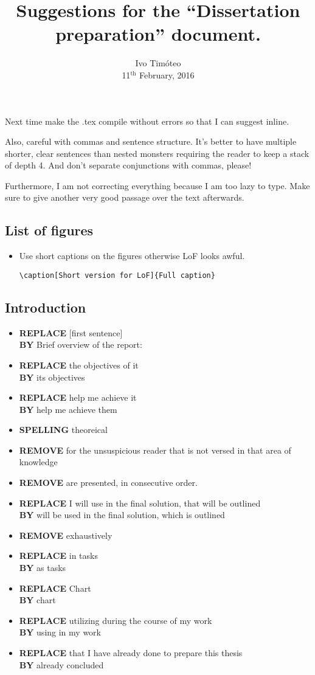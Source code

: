\documentclass[11pt]{scrartcl} %
\title{Suggestions for the ``Dissertation preparation'' document.}
\author{Ivo Timóteo \\11$^{\text{th}}$ February, 2016}
\date{}
\begin{document}
\maketitle

Next time make the .tex compile without errors so that I can suggest inline. 

Also, careful with commas and sentence structure. It's better to have multiple shorter, clear sentences than nested monsters requiring the reader to keep a stack of depth 4. And don't separate conjunctions with commas, please!

Furthermore, I am not correcting everything because I am too lazy to type. Make sure to give another very good passage over the text afterwards.

\subsection*{List of figures}
\begin{itemize}
	\item Use short captions on the figures otherwise LoF looks awful.
	\begin{verbatim}\caption[Short version for LoF]{Full caption}\end{verbatim}
\end{itemize}

\subsection*{Introduction}
\begin{itemize}
	\item {\bf REPLACE} [first sentence]\\{\bf BY} Brief overview of the report:
	\item {\bf REPLACE} the objectives of it\\{\bf BY} its objectives
	\item {\bf REPLACE} help me achieve it \\{\bf BY} help me achieve them
	\item {\bf SPELLING} theoreical
	\item {\bf REMOVE} for the unsuspicious reader that is not versed in that area of knowledge
	\item {\bf REMOVE} are presented, in consecutive order.
	\item {\bf REPLACE} I will use in the final solution, that will be outlined \\{\bf BY} will be used in the final solution, which is outlined
	\item {\bf REMOVE} exhaustively
	\item {\bf REPLACE} in tasks \\{\bf BY} as tasks
	\item {\bf REPLACE} Chart \\{\bf BY} chart
	\item {\bf REPLACE} utilizing during the course of my work \\{\bf BY} using in my work
	\item {\bf REPLACE} that I have already done to prepare this thesis \\{\bf BY} already concluded
\end{itemize}
\end{document}
